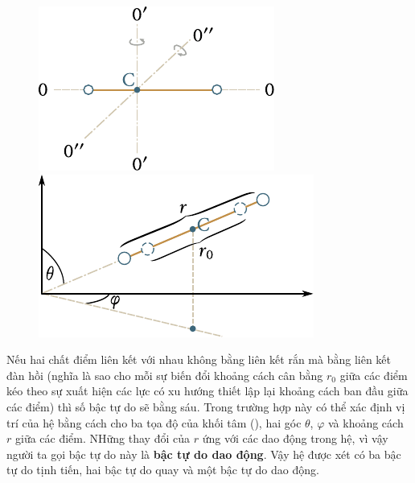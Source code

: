 \begin{figure}[!htb]
	\begin{minipage}[t]{0.5\linewidth}
		\begin{center}
			\includegraphics[scale=1.0]{figures/ch_11/fig_11_11.pdf}
			\caption[]{}
			\label{fig:11_11}
		\end{center}
	\end{minipage}
	\hspace{-0.05cm}
	\begin{minipage}[t]{0.5\linewidth}
		\begin{center}
			\includegraphics[scale=1.0]{figures/ch_11/fig_11_12.pdf}
			\caption[]{}
			\label{fig:11_12}
		\end{center}
	\end{minipage}
	\vspace{-0.4cm}
\end{figure}


Nếu hai chất điểm liên kết với nhau không bằng liên kết rắn mà bằng liên kết đàn hồi (nghĩa là sao cho mỗi sự biến đổi khoảng cách cân bằng $r_0$ giữa các điểm kéo theo sự xuất hiện các lực có xu hướng thiết lập lại khoảng cách ban đầu giữa các điểm) thì số bậc tự do sẽ bằng sáu. Trong trường hợp này có thể xác định vị trí của hệ bằng cách cho ba tọa độ của khối tâm (), hai góc $\theta$, $\varphi$ và khoảng cách $r$ giữa các điểm. NHững thay đổi của $r$ ứng với các dao động trong hệ, vì vậy người ta gọi bậc tự do này là \textbf{bậc tự do dao động}.
Vậy hệ được xét có ba bậc tự do tịnh tiến, hai bậc tự do quay và một bậc tự do dao động.

